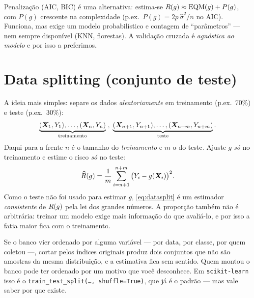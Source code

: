 \documentclass[11pt,a4paper]{article}
\begin{document}
\begin{observacao}
Penalização (AIC, BIC) é uma alternativa: estima-se
$R(g)\approx \mathrm{EQM}(g)+P(g)$, com $P(g)$ crescente na complexidade
(p.ex.\ $P(g)=2p\,\widehat\sigma^2/n$ no AIC). Funciona, mas exige um modelo
probabilístico e contagem de ``parâmetros'' --- nem sempre disponível (KNN,
florestas). A validação cruzada é \emph{agnóstica ao modelo} e por isso a
preferimos.
\end{observacao}

\section{Data splitting (conjunto de teste)}
A ideia mais simples: separe os dados \emph{aleatoriamente} em treinamento
(p.ex.\ 70\%) e teste (p.ex.\ 30\%):
\[
  \underbrace{(\bm{X}_1,Y_1),\dots,(\bm{X}_n,Y_n)}_{\text{treinamento}}\;,\;
  \underbrace{(\bm{X}_{n+1},Y_{n+1}),\dots,(\bm{X}_{n+m},Y_{n+m})}_{\text{teste}}.
\]
Daqui para a frente $n$ é o tamanho do \emph{treinamento} e $m$ o do teste.
Ajuste $g$ \emph{só} no treinamento e estime o risco \emph{só} no teste:
\begin{equation}\label{eq:datasplit}
  \widehat{R}(g) = \frac{1}{m}\sum_{i=n+1}^{n+m} \big(Y_i - g(\bm{X}_i)\big)^2 .
\end{equation}
Como o teste não foi usado para estimar $g$, \eqref{eq:datasplit} é um
estimador \emph{consistente} de $R(g)$ pela lei dos grandes números. A
proporção também não é arbitrária: treinar um modelo exige mais informação do que
avaliá-lo, e por isso a fatia maior fica com o treinamento.

\begin{atencao}
Se o banco vier ordenado por alguma variável --- por data, por classe, por quem
coletou ---, cortar pelos índices originais produz dois conjuntos que não são
amostras da mesma distribuição, e a estimativa fica sem sentido. Quem montou o banco
pode ter ordenado por um motivo que você desconhece. Em \texttt{scikit-learn} isso é
o \texttt{train\_test\_split(\dots, shuffle=True)}, que já é o padrão --- mas vale
saber por que existe.
\end{atencao}
\end{document}
